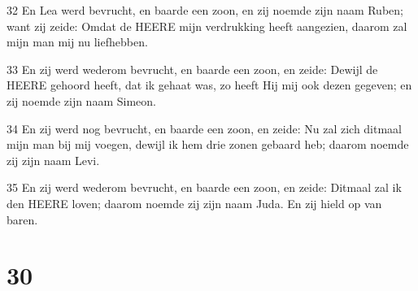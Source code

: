 \par 32 En Lea werd bevrucht, en baarde een zoon, en zij noemde zijn naam Ruben; want zij zeide: Omdat de HEERE mijn verdrukking heeft aangezien, daarom zal mijn man mij nu liefhebben.
\par 33 En zij werd wederom bevrucht, en baarde een zoon, en zeide: Dewijl de HEERE gehoord heeft, dat ik gehaat was, zo heeft Hij mij ook dezen gegeven; en zij noemde zijn naam Simeon.
\par 34 En zij werd nog bevrucht, en baarde een zoon, en zeide: Nu zal zich ditmaal mijn man bij mij voegen, dewijl ik hem drie zonen gebaard heb; daarom noemde zij zijn naam Levi.
\par 35 En zij werd wederom bevrucht, en baarde een zoon, en zeide: Ditmaal zal ik den HEERE loven; daarom noemde zij zijn naam Juda. En zij hield op van baren.

\chapter{30}

